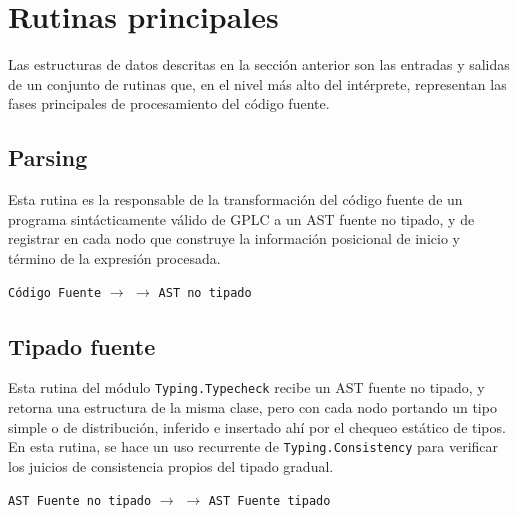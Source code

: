 \section{Rutinas principales}

Las estructuras de datos descritas en la sección anterior son las
entradas y salidas de un conjunto de rutinas que, en el nivel más alto
del intérprete, representan las fases principales de procesamiento del
código fuente.

\subsection{Parsing} Esta rutina es la responsable de la
transformación del código fuente de un programa sintácticamente válido
de GPLC a un AST fuente no tipado, y de registrar en cada nodo que
construye la información posicional de inicio y término de la
expresión procesada.

\begin{center}
  \texttt{Código Fuente}
  $\rightarrow$
  $\rightarrow$
  \texttt{AST no tipado}
\end{center}


\subsection{Tipado fuente} Esta rutina del módulo \verb|Typing.Typecheck| recibe un AST fuente no tipado,
y retorna una estructura de la misma clase, pero con cada nodo portando un tipo simple o de distribución, inferido e insertado ahí por el chequeo estático de tipos. En esta rutina, se hace un uso recurrente  de \verb|Typing.Consistency| para verificar los juicios de consistencia propios del tipado gradual.
\begin{center}
  \texttt{AST Fuente no tipado}
  $\rightarrow$
  $\rightarrow$ \texttt{AST Fuente tipado}
\end{center}

